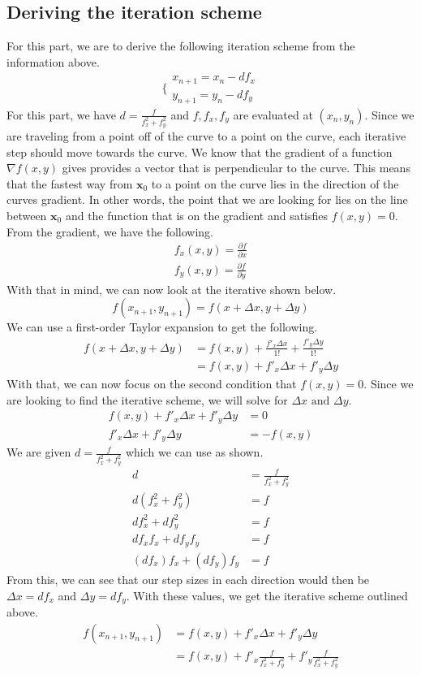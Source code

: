 \documentclass{article}
\begin{document}
\subsection{Deriving the iteration scheme}
For this part, we are to derive the following iteration scheme from the information above.
\[
\Biggl\{
\begin{split}
    x_{n+1} = x_n - df_x \\
    y_{n+1} = y_n - df_y
\end{split}
\]
For this part, we have \(d = \frac{f}{f_x^2+f_y^2}\) and \(f,f_x,f_y\) are evaluated at \((x_n,y_n)\). Since we are traveling from a point off of the curve to a point on the curve, each iterative step should move towards the curve. We know that the gradient of a function \(\nabla f(x,y)\) gives provides a vector that is perpendicular to the curve. This means that the fastest way from \(\mathbf{x}_0\) to a point on the curve lies in the direction of the curves gradient. In other words, the point that we are looking for lies on the line between \(\mathbf{x}_0\) and the function that is on the gradient and satisfies \(f(x,y)=0\). From the gradient, we have the following.
\[
\begin{split}
    f_x(x,y) = \frac{\partial f}{\partial x} \\
    f_y(x,y) = \frac{\partial f}{\partial y}
\end{split}
\]
With that in mind, we can now look at the iterative shown below.
\[
f(x_{n+1},y_{n+1}) = f(x + \Delta x, y + \Delta y)
\]
We can use a first-order Taylor expansion to get the following.
\[
\begin{split}
    f(x + \Delta x, y + \Delta y) &= f(x,y)+\frac{f'_x \Delta x}{1!}+\frac{f'_y\Delta y}{1!} \\
    &= f(x,y) + f'_x \Delta x + f'_y \Delta y
\end{split}
\]
With that, we can now focus on the second condition that \(f(x,y) = 0\). Since we are looking to find the iterative scheme, we will solve for \(\Delta x \mbox{ and } \Delta y\).
\[
\begin{split}
    f(x,y) + f'_x \Delta x + f'_y \Delta y &= 0 \\
    f'_x \Delta x + f'_y \Delta y &= -f(x,y)
\end{split}
\]
We are given \(d = \frac{f}{f_x^2+f_y^2}\) which we can use as shown.
\[
\begin{split}
    d &= \frac{f}{f_x^2+f_y^2} \\
    d(f_x^2+f_y^2) &= f \\
    df_x^2+df_y^2 &= f \\
    df_xf_x+df_yf_y &= f \\
    (df_x)f_x+(df_y)f_y &= f
\end{split}
\]
From this, we can see that our step sizes in each direction would then be \(\Delta x = df_x\) and \(\Delta y = df_y\). With these values, we get the iterative scheme outlined above.
\[
\begin{split}
    f(x_{n+1},y_{n+1}) &= f(x,y) + f'_x \Delta x + f'_y \Delta y \\
    &= f(x,y) +f'_x\frac{f}{f_x^2+f_y^2}+f'_y\frac{f}{f_x^2+f_y^2} \\
\end{split}
\]
\end{document}
